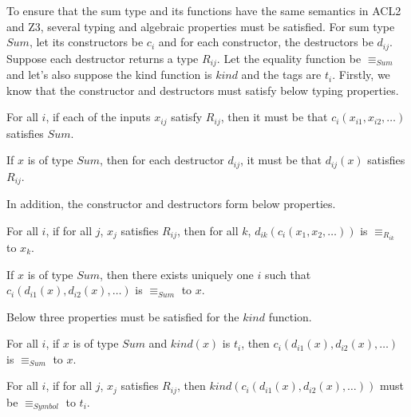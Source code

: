 To ensure that the sum type and its functions have the same semantics in ACL2
and Z3, several typing and algebraic properties must be satisfied. For sum type
$Sum$, let its constructors be $c_i$ and for each constructor, the destructors
be $d_{ij}$. Suppose each destructor returns a type $R_{ij}$. Let the equality
function be $\equiv_{Sum}$ and let's also suppose the kind function is $kind$ and the
tags are $t_{i}$. Firstly, we know that the constructor and destructors must
satisfy below typing properties.

\begin{property}
  For all $i$, if each of the inputs $x_{ij}$ satisfy $R_{ij}$, then
  it must be that $c_i(x_{i1}, x_{i2}, \ldots)$ satisfies $Sum$.
\end{property}

\begin{property}
  If $x$ is of type $Sum$, then for each destructor $d_{ij}$, it must be that
  $d_{ij}(x)$ satisfies $R_{ij}$.
\end{property}

\noindent In addition, the constructor and destructors form below properties.

\begin{property}
  For all $i$, if for all $j$, $x_j$ satisfies $R_{ij}$, then for all $k$,
  $d_{ik}(c_i(x_1, x_2, \ldots))$ is $\equiv_{R_{ik}}$ to $x_k$.
\end{property}

\begin{property}
  If $x$ is of type $Sum$, then there exists uniquely one $i$ such that
  $c_i(d_{i1}(x), d_{i2}(x), \ldots)$ is $\equiv_{Sum}$ to $x$.
\end{property}

\noindent Below three properties must be satisfied for the $kind$ function.
\begin{property}
  For all $i$, if $x$ is of type $Sum$ and $kind(x)$ is $t_i$, then
  $c_i(d_{i1}(x), d_{i2}(x), \ldots)$ is $\equiv_{Sum}$ to $x$.
\end{property}

\begin{property}
  For all $i$, if for all $j$, $x_j$ satisfies $R_{ij}$, then
  $kind(c_i(d_{i1}(x), d_{i2}(x), \ldots))$ must be $\equiv_{Symbol}$ to $t_{i}$.
\end{property}


